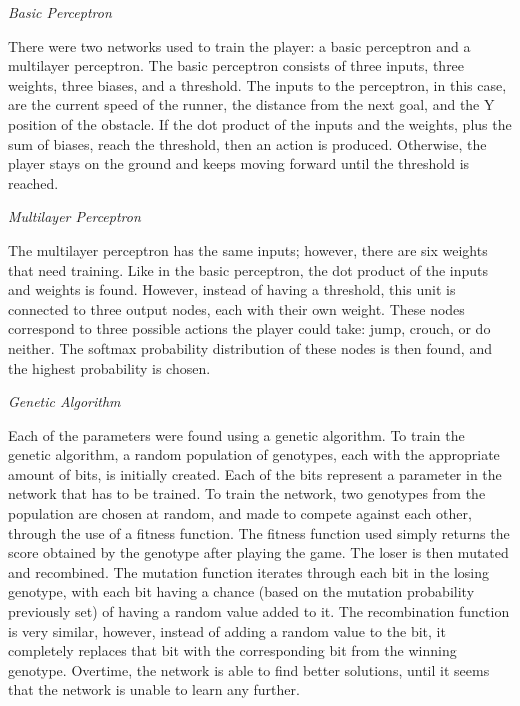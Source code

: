 \documentclass[12pt]{article}
\begin{document}
\begin{flushleft}
\noindent\emph{Basic Perceptron}


There were two networks used to train the player: a basic perceptron and a multilayer perceptron. The basic perceptron consists of three inputs, three weights, three biases, and a threshold. The inputs to the perceptron, in this case, are the current speed of the runner, the distance from the next goal, and the Y position of the obstacle. If the dot product of the inputs and the weights, plus the sum of biases, reach the threshold, then an action is produced. Otherwise, the player stays on the ground and keeps moving forward until the threshold is reached. 

\hfill

\noindent\emph{Multilayer Perceptron}

The multilayer perceptron has the same inputs; however, there are six weights that need training. Like in the basic perceptron, the dot product of the inputs and weights is found. However, instead of having a threshold, this unit is connected to three output nodes, each with their own weight. These nodes correspond to three possible actions the player could take: jump, crouch, or do neither. The softmax probability distribution of these nodes is then found, and the highest probability is chosen. 

\hfill

\noindent\emph{Genetic Algorithm}

Each of the parameters were found using a genetic algorithm. To train the genetic algorithm, a random population of genotypes, each with the appropriate amount of bits, is initially created. Each of the bits represent a parameter in the network that has to be trained. To train the network, two genotypes from the population are chosen at random, and made to compete against each other, through the use of a fitness function. The fitness function used simply returns the score obtained by the genotype after playing the game. The loser is then mutated and recombined. The mutation function iterates through each bit in the losing genotype, with each bit having a chance (based on the mutation probability previously set) of having a random value added to it. The recombination function is very similar, however, instead of adding a random value to the bit, it completely replaces that bit with the corresponding bit from the winning genotype. Overtime, the network is able to find better solutions, until it seems that the network is unable to learn any further.

\hfill


\end{flushleft}
\end{document}
